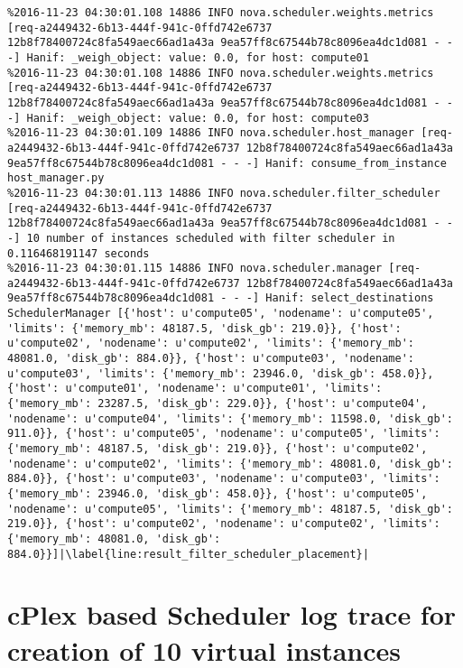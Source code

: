 \begin{lstlisting}[frame=single, caption={The filter scheduler log trace for 10 virtual instances}, label={lst:filterschedulercodetracelog10vi}, escapechar=|]
%2016-11-23 04:30:01.107 14886 INFO nova.scheduler.weights.metrics [req-a2449432-6b13-444f-941c-0ffd742e6737 12b8f78400724c8fa549aec66ad1a43a 9ea57ff8c67544b78c8096ea4dc1d081 - - -] Hanif: _weigh_object: value: 0.0, for host: compute02
%2016-11-23 04:30:01.108 14886 INFO nova.scheduler.weights.metrics [req-a2449432-6b13-444f-941c-0ffd742e6737 12b8f78400724c8fa549aec66ad1a43a 9ea57ff8c67544b78c8096ea4dc1d081 - - -] Hanif: _weigh_object: value: 0.0, for host: compute01
%2016-11-23 04:30:01.108 14886 INFO nova.scheduler.weights.metrics [req-a2449432-6b13-444f-941c-0ffd742e6737 12b8f78400724c8fa549aec66ad1a43a 9ea57ff8c67544b78c8096ea4dc1d081 - - -] Hanif: _weigh_object: value: 0.0, for host: compute03
%2016-11-23 04:30:01.109 14886 INFO nova.scheduler.host_manager [req-a2449432-6b13-444f-941c-0ffd742e6737 12b8f78400724c8fa549aec66ad1a43a 9ea57ff8c67544b78c8096ea4dc1d081 - - -] Hanif: consume_from_instance host_manager.py
%2016-11-23 04:30:01.113 14886 INFO nova.scheduler.filter_scheduler [req-a2449432-6b13-444f-941c-0ffd742e6737 12b8f78400724c8fa549aec66ad1a43a 9ea57ff8c67544b78c8096ea4dc1d081 - - -] 10 number of instances scheduled with filter scheduler in 0.116468191147 seconds
%2016-11-23 04:30:01.115 14886 INFO nova.scheduler.manager [req-a2449432-6b13-444f-941c-0ffd742e6737 12b8f78400724c8fa549aec66ad1a43a 9ea57ff8c67544b78c8096ea4dc1d081 - - -] Hanif: select_destinations SchedulerManager [{'host': u'compute05', 'nodename': u'compute05', 'limits': {'memory_mb': 48187.5, 'disk_gb': 219.0}}, {'host': u'compute02', 'nodename': u'compute02', 'limits': {'memory_mb': 48081.0, 'disk_gb': 884.0}}, {'host': u'compute03', 'nodename': u'compute03', 'limits': {'memory_mb': 23946.0, 'disk_gb': 458.0}}, {'host': u'compute01', 'nodename': u'compute01', 'limits': {'memory_mb': 23287.5, 'disk_gb': 229.0}}, {'host': u'compute04', 'nodename': u'compute04', 'limits': {'memory_mb': 11598.0, 'disk_gb': 911.0}}, {'host': u'compute05', 'nodename': u'compute05', 'limits': {'memory_mb': 48187.5, 'disk_gb': 219.0}}, {'host': u'compute02', 'nodename': u'compute02', 'limits': {'memory_mb': 48081.0, 'disk_gb': 884.0}}, {'host': u'compute03', 'nodename': u'compute03', 'limits': {'memory_mb': 23946.0, 'disk_gb': 458.0}}, {'host': u'compute05', 'nodename': u'compute05', 'limits': {'memory_mb': 48187.5, 'disk_gb': 219.0}}, {'host': u'compute02', 'nodename': u'compute02', 'limits': {'memory_mb': 48081.0, 'disk_gb': 884.0}}]|\label{line:result_filter_scheduler_placement}|
\end{lstlisting}

\section{cPlex based Scheduler log trace for creation of 10 virtual instances}\label{app:sec:cplexschedulerlogtrace10vi}

